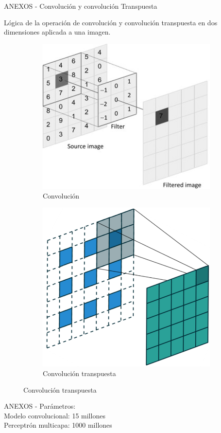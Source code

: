 \documentclass[12pt,aspectratio=169]{beamer}
\begin{document}
\begin{frame}{ANEXOS -  Convolución y convolución Transpuesta}

    Lógica de la operación de convolución y convolución transpuesta en dos dimensiones aplicada a una imagen.

    \begin{figure}
        \begin{subfigure}{0.45\textwidth}
            \centering
            \includegraphics[scale=0.325]{figs/conv_2d.jpg}
            \caption{Convolución}
        \end{subfigure}
        \begin{subfigure}{0.45\textwidth}
            \centering
            \includegraphics[scale=0.30]{figs/trans_conv.PNG}
            \caption{Convolución transpuesta}
        \end{subfigure}
    \end{figure}

\end{frame}

\begin{frame}{ANEXOS - }
    Parámetros:\\
    Modelo convolucional: 15 millones\\
    Perceptrón multicapa: 1000 millones
\end{frame}
\end{document}
